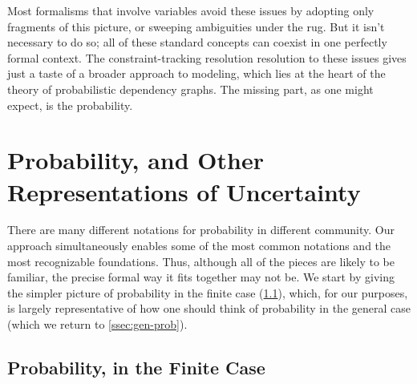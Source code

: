 Most formalisms that involve variables avoid these issues by adopting only fragments of this picture, or sweeping ambiguities under the rug.
But it isn't necessary to do so; all of these standard concepts can coexist in one perfectly formal context.
The constraint-tracking resolution resolution to these issues gives just a taste of a broader approach to modeling, which lies at the heart of the theory of probabilistic dependency graphs. 
The missing part, as one might expect, is the probability. 

\section{Probability, and Other Representations of Uncertainty}

There are many different notations for probability in different community.
Our approach simultaneously enables some of the most common notations
    and the most recognizable foundations. 
Thus, although all of the pieces are likely to be familiar, the precise formal way it fits together may not be. 
%
We start by giving the simpler picture of probability in the finite case (\cref{ssec:fin-prob}), which, for our purposes, is largely representative of how one should think of probability in the general case (which we return to \cref{ssec:gen-prob}).

\subsection{Probability, in the Finite Case}
    \label{ssec:fin-prob}
